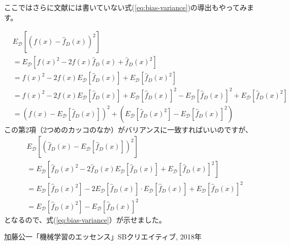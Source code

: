 \documentclass[11pt]{article}
\begin{document}
ここではさらに文献\cite{mle}には書いていない式(\ref{eq:bias-variance})の導出もやってみます。

\begin{align*}
&E_{\mathcal{D}} \left[
\left(f(x)-\hat{f}_D(x)\right)^2
\right]\\
&=
E_{\mathcal{D}} \left[
f(x)^2-2f(x)\hat{f}_D(x) + \hat{f}_D(x)^2
\right]
\\
&=
f(x)^2-2f(x) E_{\mathcal{D}} \left[\hat{f}_D(x)\right]
+ E_{\mathcal{D}} \left[\hat{f}_D(x)^2\right]
\\
&=
f(x)^2-2f(x) E_{\mathcal{D}} \left[\hat{f}_D(x)\right]
+ E_{\mathcal{D}} \left[\hat{f}_D(x)\right]^2
- E_{\mathcal{D}} \left[\hat{f}_D(x)\right]^2
+ E_{\mathcal{D}} \left[\hat{f}_D(x)^2\right]
\\
&=
\left(f(x)-E_{\mathcal{D}}
\left[\hat{f}_D(x)\right]
\right)^2
+ \left(
E_{\mathcal{D}} \left[\hat{f}_D(x)^2\right]
- E_{\mathcal{D}} \left[\hat{f}_D(x)\right]^2
\right)
\end{align*}
この第2項（2つめのカッコのなか）がバリアンスに一致すればいいのですが、
\begin{align*}
&E_{\mathcal{D}}\left[
\left(\hat{f}_D(x) -
E_{\mathcal{D}}\left[\hat{f}_D(x)\right]\right)^2
\right]\\
&=
E_{\mathcal{D}}\left[
\hat{f}_D(x)^2
-2\hat{f}_D(x) E_{\mathcal{D}}\left[\hat{f}_D(x)\right]
+E_{\mathcal{D}}\left[\hat{f}_D(x)\right]^2
\right]\\
&=
E_{\mathcal{D}}\left[
  \hat{f}_D(x)^2
  \right]
-2E_{\mathcal{D}}\left[\hat{f}_D(x)\right] \cdot E_{\mathcal{D}}\left[\hat{f}_D(x)\right]
+E_{\mathcal{D}}\left[\hat{f}_D(x)\right]^2\\
&=
E_{\mathcal{D}}\left[
  \hat{f}_D(x)^2
  \right]
-E_{\mathcal{D}}\left[\hat{f}_D(x)\right]^2
\end{align*}
となるので、式(\ref{eq:bias-variance}）が示せました。

\begin{thebibliography}{99}
 加藤公一「機械学習のエッセンス」SBクリエイティブ, 2018年
\end{thebibliography}
\end{document}
